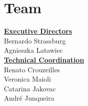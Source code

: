 

\chapter*{Team} \label{ch:equipe}

 \textbf {\underline{Executive Directors}}\\[0.3cm]
 Bernardo Strassburg \\
 Agnieszka Latawiec 
\\[0.7cm]
\textbf{\underline{Technical Coordination}}\\[0.3cm]
Renato Crouzeilles\\
Veronica Maioli\\
Catarina Jakovac\\
André Junqueira\\

